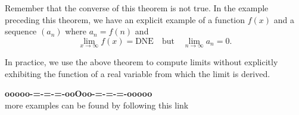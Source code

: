 \documentclass{ximera}
\begin{document}
\begin{warning}
Remember that the converse of this theorem is not
true.  In the example preceding this theorem, we have an explicit example of a function $f(x)$ and a sequence $(a_n)$ where $a_n
=f(n)$ and
\[
\lim\limits_{x\to\infty}f(x)=\text{DNE} \quad\text{but} \quad \lim\limits_{n\to\infty} a_n = 0.
\]
\end{warning}

In practice, we use the above theorem to compute limits without explicitly exhibiting the function of a real variable from which the limit is derived.  










\begin{center}
\textbf{\textcolor{green!50!black}{ooooo-=-=-=-ooOoo-=-=-=-ooooo}} \\

more examples can be found by following this link\\ 

\end{center}
\end{document}
